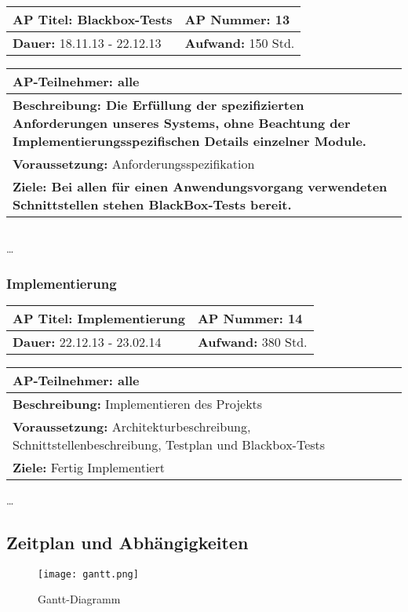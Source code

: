 \begin{tabular}{|p{7.43cm}|p{7.43cm}|}
\hline
\textbf{AP Titel: }Blackbox-Tests & \textbf{AP Nummer: }13\\ 
\hline
\textbf{Dauer: }18.11.13 - 22.12.13& \textbf{Aufwand: }150 Std.\\
\hline
\end{tabular}
\begin{tabular}{|p{15.3cm}|}
\hline
\textbf{AP-Teilnehmer: }alle\\
\hline
\textbf{Beschreibung: Die Erfüllung der spezifizierten Anforderungen unseres Systems, ohne
Beachtung der Implementierungsspezifischen Details einzelner Module.}\\
\hline
\textbf{Voraussetzung: }Anforderungsspezifikation\\
\hline 
\textbf{Ziele: Bei allen für einen Anwendungsvorgang verwendeten Schnittstellen stehen BlackBox-Tests bereit.}\\
\hline 
\end{tabular}
\begin{verbatim}

\end{verbatim}

\ldots

\subsubsection{Implementierung}

\begin{tabular}{|p{7.43cm}|p{7.43cm}|}
\hline
\textbf{AP Titel: }Implementierung & \textbf{AP Nummer: }14\\ 
\hline
\textbf{Dauer: }22.12.13 - 23.02.14& \textbf{Aufwand: } 380 Std.\\
\hline
\end{tabular}
\begin{tabular}{|p{15.3cm}|}
\hline
\textbf{AP-Teilnehmer: }alle\\
\hline
\textbf{Beschreibung: }Implementieren des Projekts\\
\hline
\textbf{Voraussetzung: }Architekturbeschreibung, Schnittstellenbeschreibung, Testplan und Blackbox-Tests \\
\hline 
\textbf{Ziele: }Fertig Implementiert\\
\hline 
\end{tabular}

\ldots

\subsection{Zeitplan und Abhängigkeiten}
\newpage
\begin{figure}[H]
\centering
\texttt{[image: gantt.png]}
\caption{Gantt-Diagramm}
\end{figure}


